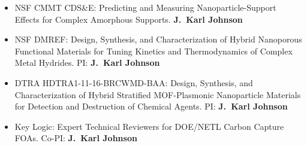 \begin{itemize}
	\item NSF CMMT CDS\&E: Predicting and Measuring Nanoparticle-Support Effects for Complex Amorphous Supports. \textbf{J.\ Karl Johnson}

	\item NSF DMREF: Design, Synthesis, and Characterization of Hybrid Nanoporous Functional Materials for Tuning Kinetics and Thermodynamics of Complex Metal Hydrides.  PI: \textbf{J.\ Karl Johnson}

	\item DTRA HDTRA1-11-16-BRCWMD-BAA: Design, Synthesis, and Characterization of Hybrid Stratified MOF-Plasmonic Nanoparticle Materials for Detection and Destruction of Chemical Agents.  PI: \textbf{J.\ Karl Johnson}

	\item Key Logic: Expert Technical Reviewers for DOE/NETL Carbon Capture FOAs. Co-PI: \textbf{J.\ Karl Johnson}

\end{itemize}


